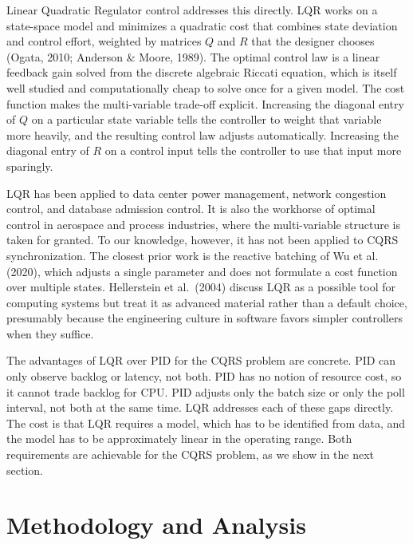 \documentclass[10pt,a4paper]{article}
\begin{document}
Linear Quadratic Regulator control addresses this directly. LQR works on a state-space model and minimizes a quadratic cost that combines state deviation and control effort, weighted by matrices $Q$ and $R$ that the designer chooses (Ogata, 2010; Anderson \& Moore, 1989). The optimal control law is a linear feedback gain solved from the discrete algebraic Riccati equation, which is itself well studied and computationally cheap to solve once for a given model. The cost function makes the multi-variable trade-off explicit. Increasing the diagonal entry of $Q$ on a particular state variable tells the controller to weight that variable more heavily, and the resulting control law adjusts automatically. Increasing the diagonal entry of $R$ on a control input tells the controller to use that input more sparingly.

LQR has been applied to data center power management, network congestion control, and database admission control. It is also the workhorse of optimal control in aerospace and process industries, where the multi-variable structure is taken for granted. To our knowledge, however, it has not been applied to CQRS synchronization. The closest prior work is the reactive batching of Wu et al. (2020), which adjusts a single parameter and does not formulate a cost function over multiple states. Hellerstein et al.\ (2004) discuss LQR as a possible tool for computing systems but treat it as advanced material rather than a default choice, presumably because the engineering culture in software favors simpler controllers when they suffice.

The advantages of LQR over PID for the CQRS problem are concrete. PID can only observe backlog or latency, not both. PID has no notion of resource cost, so it cannot trade backlog for CPU. PID adjusts only the batch size or only the poll interval, not both at the same time. LQR addresses each of these gaps directly. The cost is that LQR requires a model, which has to be identified from data, and the model has to be approximately linear in the operating range. Both requirements are achievable for the CQRS problem, as we show in the next section.

\section{Methodology and Analysis}
\end{document}
